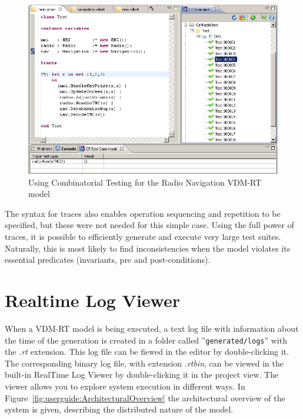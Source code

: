 \begin{figure}[htbp]
\begin{center}
\includegraphics[width=4.5in]{figures/tracesradnav}
\caption{Using Combinatorial Testing for the Radio Navigation VDM-RT model\label{fig:tracesradnav}}
\end{center}
\end{figure}

The syntax for traces also enables operation sequencing and repetition to be
specified, but these were not needed for this simple case. Using the full power
of traces, it is possible to efficiently generate and execute very large test
suites. Naturally, this is most likely to find inconsistencies when the model
violates its essential predicates (invariants, pre and post-conditions).

\section{Realtime Log Viewer}\label{sec:RTLV}

When a VDM-RT model is being executed, a text log file with
information about the time of the generation is created in
a folder called ''\texttt{generated/logs}'' with the
\emph{.rt} extension.
This log file can be fiewed in the editor by double-clicking it.  The corresponding binary log file, with extension \emph{.rtbin}, can be viewed in the built-in
RealTime Log Viewer by double-clicking it in the project
view. The viewer allows you to explore system execution in different
ways. In Figure~\ref{fig:userguide:ArchitecturalOverview} the
architectural overview of the system is given, describing the
distributed nature of the model.

